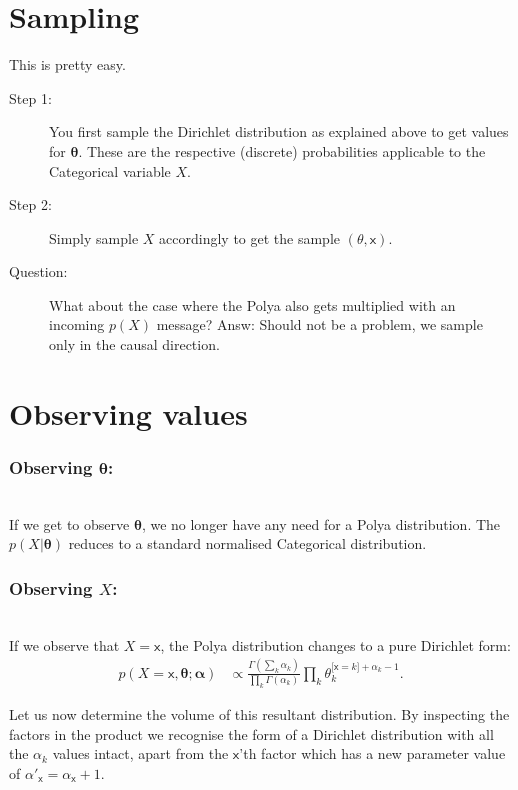 \documentclass[oneside,english]{scrbook}
\begin{document}
\section{Sampling}
This is pretty easy.
\begin{description}
  \item[Step 1:] You first sample the Dirichlet distribution as
    explained above to get values for $\bm{\theta}$. These are the
    respective (discrete) probabilities applicable to the Categorical
    variable $X$.
  \item[Step 2:] Simply sample $X$ accordingly to get the sample
    $(\bm{\mathsf{\theta}},\mathsf{x})$.
  \item [Question:] What about the case where the Polya also gets
    multiplied with an incoming $p(X)$ message? Answ: Should not be a
    problem, we sample only in the causal direction.
\end{description}

\section{Observing values} \label{sec:polya_obsv}

\subsubsection{Observing $\bm{\theta}$:}~\\
If we get to observe $\bm{\theta}$, we no longer have any need for a
Polya distribution. The $p(X|\bm{\theta})$ reduces to a standard
normalised Categorical distribution.

\subsubsection{Observing $X$:}~\\
If we observe that $X=\mathsf{x}$, the Polya distribution changes to a
pure Dirichlet form:
\begin{align}
  p(X=\mathsf{x}, \bm{\theta};\bm{\alpha})
  &\propto \frac{\Gamma(\sum_k\alpha_k) }{\prod_{k}\Gamma(\alpha_k)}
  \prod_{k}\theta_k^{\mathbb{[}\mathsf{x}=k\mathbb{]}+\alpha_k-1}. \label{eq:polya_obsvx}
\end{align}

Let us now determine the volume of this resultant distribution. By
inspecting the factors in the product we recognise the form of a
Dirichlet distribution with all the $\alpha_k$ values intact, apart
from the $\mathsf{x}$'th factor which has a new parameter value of
$\alpha'_{\mathsf{x}} = \alpha_{\mathsf{x}}+1$.
\end{document}
